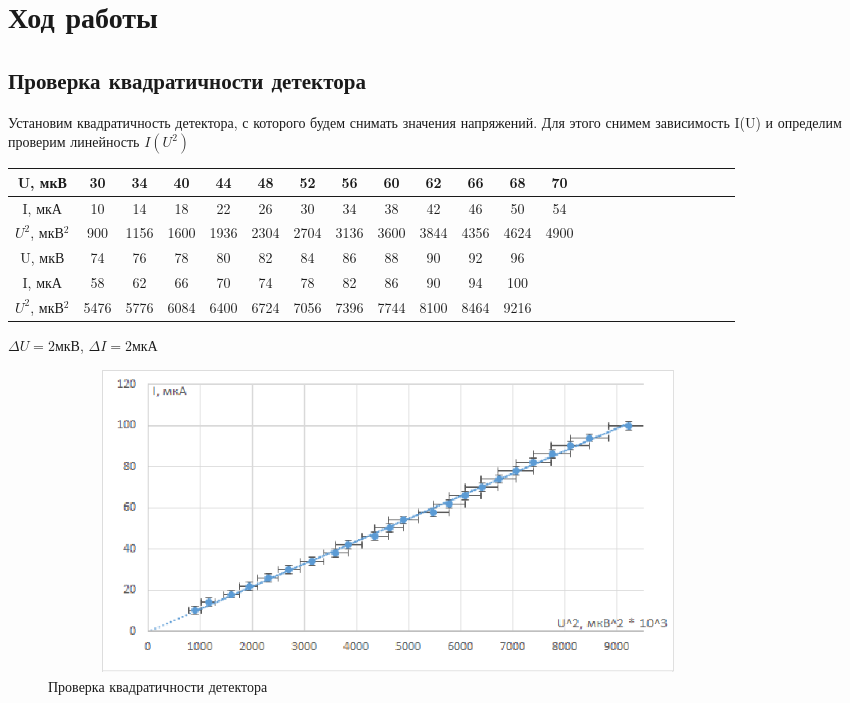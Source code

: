 \documentclass[12pt,a4paper]{article}
\begin{document}
\newpage

\section{Ход работы}
\subsection{Проверка квадратичности детектора}
	
	\par Установим квадратичность детектора, с которого будем снимать значения напряжений. Для этого снимем зависимость I(U) и определим проверим линейность $I(U^2)$

\begin{center}
	\begin{tabular}{|c|c|c|c|c|c|c|c|c|c|c|c|c|c|c|c|c|c|c|c|c|c|c|c|}
	\hline 
	U, мкВ & 30 & 34 & 40 & 44 & 48 & 52 & 56 & 60 & 62 & 66 & 68 & 70  \\ 
	\hline 
	I, мкА & 10 & 14 & 18 & 22 & 26 & 30 & 34 & 38 & 42 & 46 & 50 & 54   \\ 
	\hline 
	$U^2$, мкВ$^2$  & 900 & 1156 & 1600 & 1936 & 2304 & 2704 & 3136 & 3600 & 3844 & 4356 & 4624 & 4900   \\ 
	\hline 
	U, мкВ & 74 & 76 & 78 & 80 & 82 & 84 & 86 & 88 & 90 & 92 & 96 \\ 
	\hline 
	I, мкА & 58 & 62 & 66 & 70 & 74 & 78 & 82 & 86 & 90 & 94 & 100 \\ 
	\hline 
	$U^2$, мкВ$^2$  & 5476 & 5776 & 6084 & 6400 & 6724 & 7056 & 7396 & 7744 & 8100 & 8464 & 9216 \\ 
	\hline 
	\end{tabular} 
\end{center}

\par $\Delta{U} = 2$мкВ,    $\Delta{I} = 2$мкА

\begin{figure}[H]
	\begin{center}
		\includegraphics[width=18cm, height=8cm]{VPV-3_gr_1}
	\end{center}
	\centering \caption{Проверка квадратичности детектора}
	\label{gr1}
\end{figure}
\end{document}
